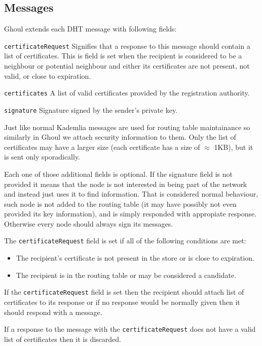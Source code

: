 \subsection{Messages}
Ghoul extends each DHT message with following fields:
\begin{description}
  \item{\texttt{certificateRequest}} Signifies that a response to this message
    should contain a list of certificates. This is field is set when the
    recipient is considered to be a neighbour or potential neighbour and either
    its certificates are not present, not valid, or close to expiration.
  \item{\texttt{certificates}} A list of valid certificates provided by the
    registration authority.
  \item{\texttt{signature}} Signature signed by the sender's private key.
\end{description}

Just like normal Kademlia messages are used for routing table maintainance so
similarly in Ghoul we attach security information to them. Only the list of
certificates may have a larger size (each certificate has a size of $\approx$
1KB), but it is sent only sporadically.

Each one of those additional fields is optional. If the signature field is not
provided it means that the node is not interested in being part of the network
and instead just uses it to find information. That is considered normal
behaviour, such node is not added to the routing table (it may have possibly not
even provided its key information), and is simply responded with appropiate
response. Otherwise every node should always sign its messages.

The \texttt{certificateRequest} field is set if all of the following conditions
are met:

\begin{itemize}
  \item The recipient's certificate is not present in the store or is close to
    expiration.
  \item The recipient is in the routing table or may be considered a candidate.
\end{itemize}

If the \texttt{certificateRequest} field is set then the recipient should attach
list of certificates to its response or if no response would be normally given
then it should respond with a  message.

If a response to the message with the \texttt{certificateRequest} does not have
a valid list of certificates then it is discarded.

